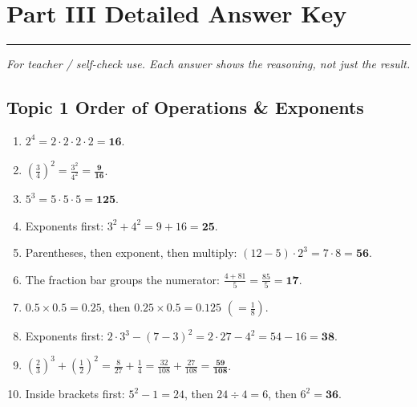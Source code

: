 \documentclass[11pt]{article}
\begin{document}
\clearpage
\section*{Part III \; \textbullet\; Detailed Answer Key}
{\color{fangblue}\rule{\linewidth}{0.8pt}}

\begin{mdframed}[backgroundcolor=keygray,linecolor=fangmid,linewidth=0.8pt,roundcorner=4pt]
\small\itshape For teacher / self-check use. Each answer shows the reasoning, not just the result.
\end{mdframed}

\subsection*{Topic 1 \; \textbullet\; Order of Operations \& Exponents}
\begin{enumerate}[label=\textbf{\color{fangblue}\arabic*.},leftmargin=*,itemsep=5pt]
\item $2^{4}=2\cdot2\cdot2\cdot2=\mathbf{16}$.
\item $\left(\frac{3}{4}\right)^{2}=\frac{3^{2}}{4^{2}}=\mathbf{\frac{9}{16}}$.
\item $5^{3}=5\cdot5\cdot5=\mathbf{125}$.
\item Exponents first: $3^{2}+4^{2}=9+16=\mathbf{25}$.
\item Parentheses, then exponent, then multiply: $(12-5)\cdot2^{3}=7\cdot 8=\mathbf{56}$.
\item The fraction bar groups the numerator: $\frac{4+81}{5}=\frac{85}{5}=\mathbf{17}$.
\item $0.5\times0.5=0.25$, then $0.25\times0.5=\mathbf{0.125}$ \; $\left(=\tfrac{1}{8}\right)$.
\item Exponents first: $2\cdot 3^{3}-(7-3)^{2}=2\cdot 27-4^{2}=54-16=\mathbf{38}$.
\item $\left(\frac{2}{3}\right)^{3}+\left(\frac{1}{2}\right)^{2}=\frac{8}{27}+\frac{1}{4}
      =\frac{32}{108}+\frac{27}{108}=\mathbf{\frac{59}{108}}$.
\item Inside brackets first: $5^{2}-1=24$, then $24\div 4=6$, then $6^{2}=\mathbf{36}$.
\end{enumerate}

\end{document}
